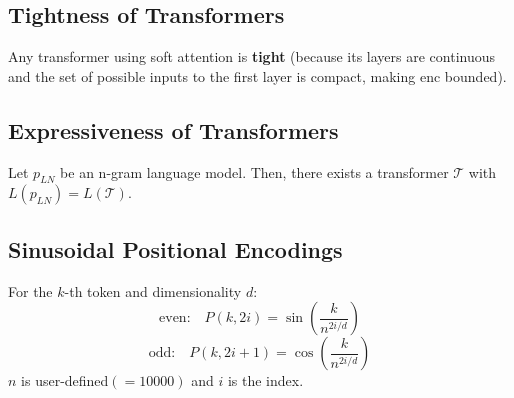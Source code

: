 \subsection*{Tightness of Transformers}
Any transformer using soft attention is \textbf{tight} (because its layers are continuous and the set of possible inputs to the first layer is compact, making $\text{enc}$ bounded).

\subsection*{Expressiveness of Transformers}
Let $p_{LN}$ be an n-gram language model. Then, there exists a transformer $\mathcal{T}$ with $L(p_{LN})=L(\mathcal{T})$.

\subsection*{Sinusoidal Positional Encodings}
For the $k$-th token and dimensionality $d$:
$$\text{even:}\quad P(k, 2i) = \sin\left(\frac{k}{n^{2i/d}}\right)$$
$$\text{odd:}\quad P(k, 2i+1) = \cos\left(\frac{k}{n^{2i/d}}\right)$$
$n$ is user-defined$(=10000)$ and $i$ is the index.
